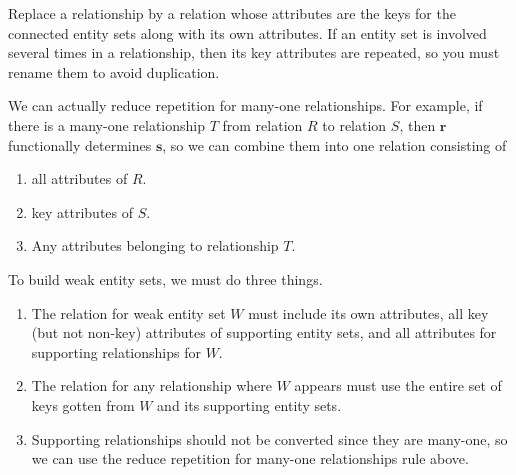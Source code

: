 \documentclass{article}
\begin{document}
    \begin{theorem}
      Replace a relationship by a relation whose attributes are the keys for the connected entity sets along with its own attributes. If an entity set is involved several times in a relationship, then its key attributes are repeated, so you must rename them to avoid duplication.
    \end{theorem}

    \begin{theorem}
      We can actually reduce repetition for many-one relationships. For example, if there is a many-one relationship $T$ from relation $R$ to relation $S$, then $\mathbf{r}$ functionally determines $\mathbf{s}$, so we can combine them into one relation consisting of 
      \begin{enumerate}
        \item all attributes of $R$. 
        \item key attributes of $S$. 
        \item Any attributes belonging to relationship $T$. 
      \end{enumerate}
    \end{theorem}
    
    \begin{theorem}
      To build weak entity sets, we must do three things. 
      \begin{enumerate}
        \item The relation for weak entity set $W$ must include its own attributes, all key (but not non-key) attributes of supporting entity sets, and all attributes for supporting relationships for $W$. 
        \item The relation for any relationship where $W$ appears must use the entire set of keys gotten from $W$ and its supporting entity sets. 
        \item Supporting relationships should not be converted since they are many-one, so we can use the reduce repetition for many-one relationships rule above. 
      \end{enumerate}
    \end{theorem}
\end{document}

